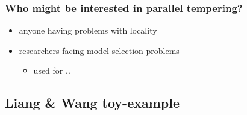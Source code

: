 \begin{frame}
		\frametitle{Who might be interested in parallel tempering? }
	
	\begin{itemize}
		\item anyone having problems with locality 
		
		\item researchers facing model selection problems 
	 
		\begin{itemize}
			\item used for ..
		\end{itemize}

	\end{itemize}	

\end{frame}


		\subsection{Liang \& Wang toy-example}



